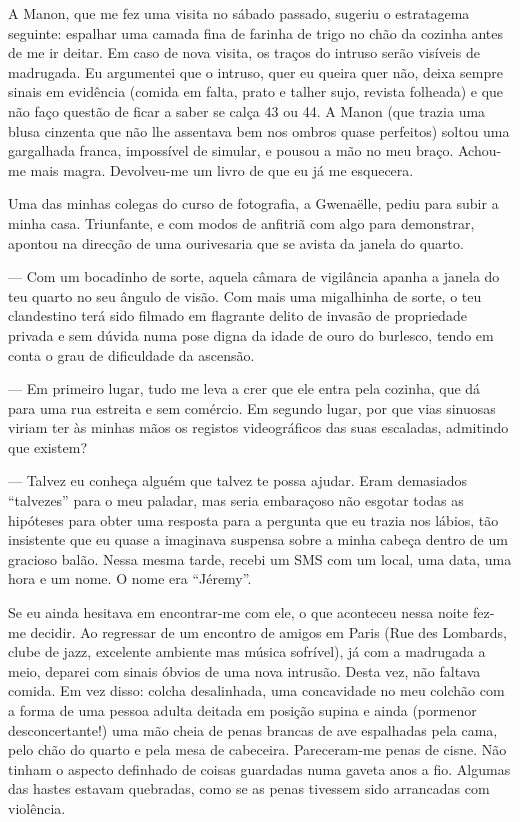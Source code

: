 A Manon, que me fez uma visita no sábado passado, sugeriu o estratagema
seguinte: espalhar uma camada fina de farinha de trigo no chão da
cozinha antes de me ir deitar. Em caso de nova visita, os traços do
intruso serão visíveis de madrugada. Eu argumentei que o intruso, quer
eu queira quer não, deixa sempre sinais em evidência (comida em falta,
prato e talher sujo, revista folheada) e que não faço questão de ficar a
saber se calça 43 ou 44. A Manon (que trazia uma blusa cinzenta que não
lhe assentava bem nos ombros quase
perfeitos) soltou uma gargalhada franca, impossível de simular, e
pousou a mão no meu braço. Achou-me mais magra. Devolveu-me um livro de
que eu já me esquecera.

Uma das minhas colegas do curso de fotografia, a Gwenaëlle, pediu para
subir a minha casa. Triunfante, e com modos de anfitriã com algo para
demonstrar, apontou na direcção de uma ourivesaria que se avista da
janela do quarto.

--- Com um bocadinho de sorte, aquela câmara de vigilância apanha a
  janela do teu quarto no seu ângulo de visão. Com mais uma migalhinha
  de sorte, o teu clandestino terá sido filmado em flagrante delito de
  invasão de propriedade privada e sem dúvida numa pose digna da idade
  de ouro do burlesco, tendo em conta o grau de dificuldade da ascensão.

--- Em primeiro lugar, tudo me leva a crer que ele entra pela cozinha, que
  dá para uma rua estreita e sem comércio. Em segundo lugar, por que
  vias sinuosas viriam ter às minhas mãos os registos videográficos das
  suas escaladas, admitindo que existem?

--- Talvez eu conheça alguém que talvez te possa ajudar. Eram demasiados
``talvezes'' para o meu paladar, mas seria embaraçoso não esgotar
todas as hipóteses para obter uma resposta
para a pergunta que eu trazia nos lábios, tão insistente que eu quase
a imaginava suspensa sobre a minha cabeça dentro de um gracioso balão.
Nessa mesma tarde, recebi um SMS com um local, uma data, uma hora e um
nome. O nome era ``Jéremy''.

Se eu ainda hesitava em encontrar-me com ele, o que aconteceu nessa
noite fez-me decidir. Ao regressar de um encontro de amigos em Paris
(Rue des Lombards, clube de jazz, excelente ambiente mas música
sofrível), já com a madrugada a meio, deparei com sinais óbvios de uma
nova
intrusão. Desta vez, não faltava comida. Em vez disso: colcha
desalinhada, uma concavidade no meu colchão com a forma de uma pessoa
adulta deitada em posição supina e ainda (pormenor desconcertante!)
uma mão cheia de penas brancas de ave espalhadas pela cama, pelo chão do
quarto e pela mesa de cabeceira. Pareceram-me penas de cisne. Não tinham
o aspecto definhado de coisas guardadas numa gaveta anos a fio. Algumas
das hastes estavam quebradas, como se as penas tivessem sido arrancadas
com violência.

